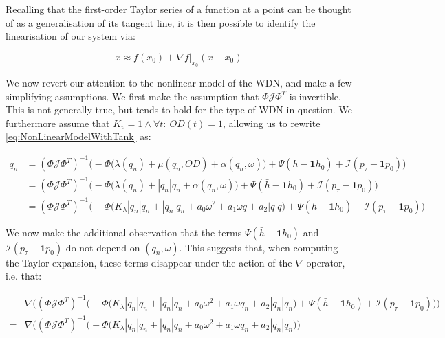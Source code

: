 Recalling that the first-order Taylor series of a function at a point can be thought of as a  generalisation of its tangent line, it is then possible to identify the linearisation of our system via:

\begin{equation}\label{eq:TaylorSeries}
\dot{x} \approx f(x_0) + \nabla f\bigg\rvert_{x_0} (x-x_0)
\end{equation}

We now revert our attention to the nonlinear model of the WDN, and make a few simplifying assumptions. We first make the assumption that $\Phi \mathcal{J} \Phi^T$ is invertible. This is not generally true, but tends to hold for the type of WDN in question. We furthermore assume that $K_v = 1 \wedge \forall t: \ OD(t) = 1$, allowing us to rewrite \cref{eq:NonLinearModelWithTank} as:

\begin{equation}\label{eq:NonLinearModelSimplified}
	\begin{split}
		\dot{q}_n &= (\Phi\mathcal{J}\Phi^T)^{-1} \Big(-\Phi\Big(\lambda(q_n)+\mu(q_n,OD)+\alpha(q_n,\omega)\Big) + \Psi(\bar{h}-\mathbf{1}h_0) + \mathcal{I}(p_{\tau}-\mathbf{1}p_0)\Big) \\
		&= 	(\Phi\mathcal{J}\Phi^T)^{-1} \Big(-\Phi\Big(\lambda(q_n)+|q_n|q_n+\alpha(q_n,\omega)\Big) + \Psi(\bar{h}-\mathbf{1}h_0) + \mathcal{I}(p_{\tau}-\mathbf{1}p_0)\Big) \\
		& = (\Phi\mathcal{J}\Phi^T)^{-1} \Big(-\Phi\Big(K_\lambda|q_n|q_n+|q_n|q_n+a_0\omega^2+a_1\omega q+a_2|q|q\Big) + \Psi(\bar{h}-\mathbf{1}h_0) + \mathcal{I}(p_{\tau}-\mathbf{1}p_0)\Big)
	\end{split}	
\end{equation}

We now make the additional observation that the terms $\Psi(\bar{h}-\mathbf{1}h_0)$ and  $\mathcal{I}(p_{\tau}-\mathbf{1}p_0)$ do not depend on $(q_n,\omega)$. This suggests that, when computing the Taylor expansion, these terms disappear under the action of the $\nabla$ operator, i.e. that:

\begin{equation}\label{eq:PressureHeightDisappear}
	\begin{split}
		&\nabla \Big((\Phi\mathcal{J}\Phi^T)^{-1} \Big(-\Phi\Big(K_\lambda|q_n|q_n+|q_n|q_n+a_0\omega^2+a_1\omega q_n+a_2|q_n|q_n\Big) + \Psi(\bar{h}-\mathbf{1}h_0) + \mathcal{I}(p_{\tau}-\mathbf{1}p_0)\Big)\Big) \\ 
		= &\nabla \Big((\Phi\mathcal{J}\Phi^T)^{-1} \Big(-\Phi\Big(K_\lambda|q_n|q_n+|q_n|q_n+a_0\omega^2+a_1\omega q_n+a_2|q_n|q_n\Big)\Big)
	\end{split}
\end{equation}

